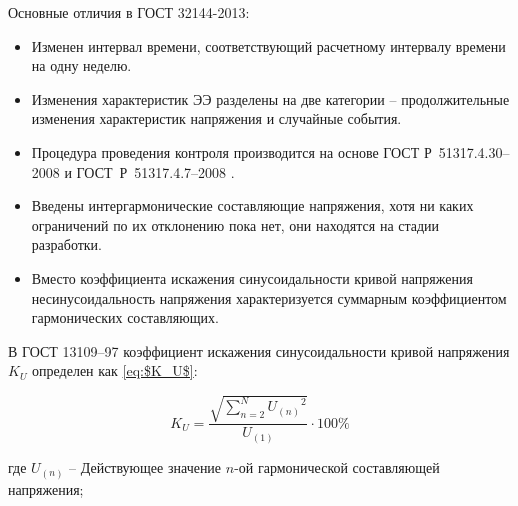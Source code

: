 Основные отличия в ГОСТ 32144-2013:
\begin{itemize}
	\item Изменен интервал времени, соответствующий расчетному интервалу времени на одну неделю.
	\item Изменения характеристик ЭЭ разделены на две категории – продолжительные изменения характеристик напряжения и случайные события.
	\item Процедура проведения контроля производится на основе ГОСТ Р~51317.4.30--2008 \cite{ГОСТР51317.4.30-2008} и ГОСТ~Р~51317.4.7--2008 \cite{ГОСТР51317.4.7-2008}.
	\item Введены интергармонические составляющие напряжения, хотя ни каких ограничений по их отклонению пока нет, они находятся на стадии разработки.
	\item Вместо коэффициента искажения синусоидальности кривой напряжения несинусоидальность напряжения характеризуется суммарным коэффициентом гармонических составляющих.
\end{itemize} 



В ГОСТ 13109--97 \cite{ГОСТ13109-97} коэффициент искажения синусоидальности кривой напряжения $K_U$ определен как \eqref{eq:$K_U$}:

\begin{equation}
\label{eq:$K_U$}
K_U = \frac{\sqrt{\sum_{n=2}^N {U_{(n)}}^2}}{U_{(1)}}\cdot 100 \%
\end{equation}

где $U_{(n)}$ -- Действующее значение $n$-ой гармонической составляющей напряжения;

